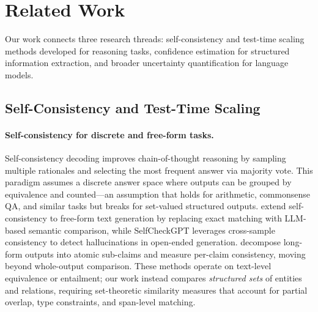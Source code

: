 \section{Related Work}\label{sec:related}

Our work connects three research threads: self-consistency and test-time scaling methods developed for reasoning tasks, confidence estimation for structured information extraction, and broader uncertainty quantification for language models.

\subsection{Self-Consistency and Test-Time Scaling}

\paragraph{Self-consistency for discrete and free-form tasks.}
Self-consistency decoding \cite{wang2023selfconsistency} improves chain-of-thought reasoning by sampling multiple rationales and selecting the most frequent answer via majority vote.
This paradigm assumes a discrete answer space where outputs can be grouped by equivalence and counted---an assumption that holds for arithmetic, commonsense QA, and similar tasks but breaks for set-valued structured outputs.
\citet{chen2024usc} extend self-consistency to free-form text generation by replacing exact matching with LLM-based semantic comparison, while SelfCheckGPT \cite{manakul2023selfcheckgpt} leverages cross-sample consistency to detect hallucinations in open-ended generation.
\citet{thirukovalluru2024atomic} decompose long-form outputs into atomic sub-claims and measure per-claim consistency, moving beyond whole-output comparison.
These methods operate on text-level equivalence or entailment; our work instead compares \textit{structured sets} of entities and relations, requiring set-theoretic similarity measures that account for partial overlap, type constraints, and span-level matching.

